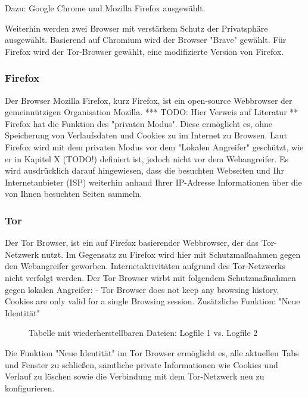 Dazu: Google Chrome und Mozilla Firefox ausgewählt.

Weiterhin werden zwei Browser mit verstärkem Schutz der Privatsphäre ausgewählt.
Basierend auf Chromium wird der Browser "Brave" gewählt.
Für Firefox wird der Tor-Browser gewählt, eine modifizierte Version von Firefox.

\subsubsection*{Firefox}
\label{subsubsection:methodik-vorbereitung-browserauswahl-firefox}
Der Browser Mozilla Firefox, kurz Firefox, ist ein open-source Webbrowser der gemeinnützigen Organisation Mozilla. 
*** TODO: Hier Verweis auf Literatur **
Firefox hat die Funktion des "privaten Modus". Diese ermöglicht es, ohne Speicherung von Verlaufsdaten und Cookies zu im Internet zu Browsen.
Laut Firefox wird mit dem privaten Modus vor dem "Lokalen Angreifer" geschützt, wie er in Kapitel X (TODO!) definiert ist, jedoch nicht vor dem Webangreifer.
Es wird ausdrücklich darauf hingewiesen, dass die besuchten Webseiten und Ihr Internetanbieter (ISP)  weiterhin anhand Ihrer IP-Adresse Informationen über die von Ihnen besuchten Seiten sammeln.


\subsubsection*{Tor}
\label{subsubsection:methodik-vorbereitung-browserauswahl-tor}
Der Tor Browser, ist ein auf Firefox basierender Webbrowser, der das Tor-Netzwerk nutzt.
Im Gegensatz zu Firefox wird hier mit Schutzmaßnahmen gegen den Webangreifer geworben.
Internetaktivitäten aufgrund des Tor-Netzwerks nicht verfolgt werden.
Der Tor Browser wirbt mit folgendem Schutzmaßnahmen gegen lokalen Angreifer:
- Tor Browser does not keep any browsing history. Cookies are only valid for a single Browsing session.
Zusätzliche Funktion: "Neue Identität"
\begin{figure}[h!]
	\caption{Tabelle mit wiederherstellbaren Dateien: Logfile 1 vs. Logfile 2}
\end{figure}
Die Funktion "Neue Identität" im Tor Browser ermöglicht es, alle aktuellen Tabs und Fenster zu schließen, sämtliche private Informationen wie Cookies und Verlauf zu löschen sowie die Verbindung mit dem Tor-Netzwerk neu zu konfigurieren.

